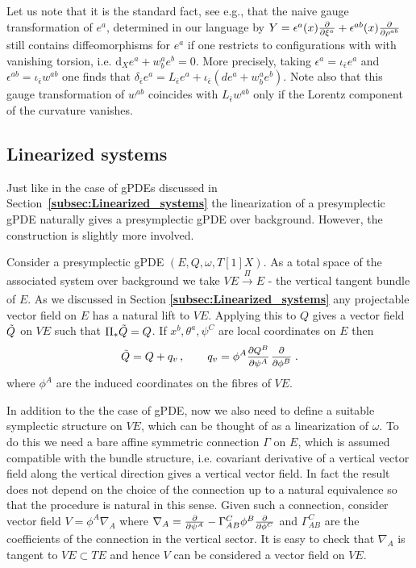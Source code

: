 \documentclass[a4paper,12pt]{article}
\numberwithin{equation}{section} %
\newcommand{\bref}[1]{\textbf{\ref{#1}}}
\newcommand{\dx}{\mathrm{d}_X}
\renewcommand{\d}{\partial}
\newcommand{\ffrac}[2]{\raisebox{.5pt}%
  {\footnotesize$\displaystyle\frac{#1}{#2}$}\kern1pt}
\newcommand{\dl}[1]{\mathchoice{\ffrac{\d}{\d #1}}{\frac{\d}{\d #1}}{\ffrac{\d}{\d #1}}{\ffrac{\d}{\d #1}}}
\newcommand{\ddl}[2]{\ffrac{\d #1}{\d #2}}
\newcommand{\lorcon}{w}
\begin{document}
Let us note that it is the standard fact, see e.g.\cite{Didenko:2014dwa}, that the naive gauge transformation of $e^a$, determined in our language by $Y=\epsilon^a(x)\dl{\xi^a}+\epsilon^{ab}(x)\dl{\rho^{ab}}$ still contains diffeomorphisms for $e^a$ if one restricts to configurations with with vanishing torsion, i.e. $\dx e^a+\lorcon^a_b e^b=0$. More precisely, taking $\epsilon^a=\iota_{\bar\epsilon}e^a$ and $\epsilon^{ab}
=\iota_{\bar\epsilon}\lorcon^{ab}$ one finds that $\delta_{\bar\epsilon} e^a=L_{\bar\epsilon}e^a+\iota_{\bar\epsilon} (de^a+\lorcon^a_b e^b)$. Note also that this gauge transformation of $\lorcon^{ab}$ coincides with $L_{\bar\epsilon}\lorcon^{ab}$ only if the Lorentz component of the curvature vanishes.




\subsection{Linearized systems}

Just like in the case of gPDEs discussed in Section~\bref{subsec:Linearized_systems} the linearization of a presymplectic gPDE naturally gives a presymplectic gPDE over background. However, the construction is slightly more involved. 

Consider a presymplectic gPDE $(E,Q,\omega,T[1]X)$.  As a total space of the associated system over background we take $VE \xrightarrow[]{\Pi} E$ - the vertical tangent bundle of $E$. As we discussed in  Section \bref{subsec:Linearized_systems} any projectable vector field on $E$ has a natural lift to $VE$. Applying this to $Q$ gives a vector field $\Tilde{Q}$ on $VE$ such that $\Pi_* \Tilde{Q}=Q$. If $x^b,\theta^a,\psi^C$ are local coordinates on $E$ then 
\begin{equation}
    \Tilde{Q} = Q + q_v\,, \qquad q_v = \phi^A \ddl{Q^B}{\psi^A} \ddl{}{\phi^B}\,.
\end{equation}
where $\phi^A$ are the induced coordinates on the fibres of $VE$.

In addition to the the case of gPDE, now we also need to define a suitable symplectic structure on $VE$, which can be thought of as a linearization of $\omega$. To do this we need a bare affine symmetric connection $\Gamma$ on $E$, which is assumed compatible with the bundle structure, i.e. covariant derivative of a vertical vector field along the vertical direction gives a vertical vector field. In fact the result does not depend on the choice of the connection up to a natural equivalence so that the procedure is natural in this sense. Given such a connection, consider vector field $V = \phi^A \nabla_A$ where $\nabla_A=\dl{\psi^A}-\Gamma_{AB}^C \phi^B\dl{\phi^C}$ 
and $\Gamma_{AB}^C$ are the coefficients of the connection in the vertical sector. It is easy to check that $\nabla_A$ is tangent to $VE \subset TE$ and hence $V$ can be considered a vector field on $VE$. 
\end{document}
